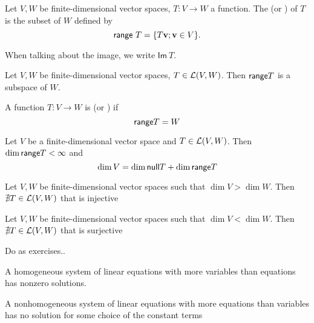 \documentclass[aspectratio=169]{beamer}
\begin{document}
\begin{frame}
\begin{definition}[Range]
Let $V,W$ be finite-dimensional vector spaces, $T:V\to W$ a function. The  (or ) of $T$ is the subset of $W$ defined by
\[
\mathsf{range}\ T=\{T\mathbf{v};\mathbf{v}\in V\}.
\]
\end{definition}
When talking about the image, we write $\mathsf{Im}\ T$.
\vfill
\begin{importanttheorem}
Let $V,W$ be finite-dimensional vector spaces, $T\in\mathcal{L}(V,W)$. Then $\mathsf{range} T$ is a subspace of $W$.
\end{importanttheorem}

\end{frame}

\begin{frame}
\begin{definition}[Surjectivity]
A function $T:V\to W$ is  (or ) if
\[
\mathsf{range} T=W
\]
\end{definition}
\vfill
\begin{importanttheorem}
Let $V$ be a finite-dimensional vector space and $T\in\mathcal{L}(V,W)$. Then $\dim\mathsf{range} T<\infty$ and
\[
\dim V=\dim\mathsf{null} T+\dim\mathsf{range} T
\]
\end{importanttheorem}
\end{frame}


\begin{frame}
\begin{importanttheorem}
Let $V,W$ be finite-dimensional vector spaces such that $\dim V>\dim W$. Then $\nexists T\in\mathcal{L}(V,W)$ that is injective
\end{importanttheorem}
\vfill
\begin{importanttheorem}
Let $V,W$ be finite-dimensional vector spaces such that $\dim V<\dim W$. Then $\nexists T\in\mathcal{L}(V,W)$ that is surjective
\end{importanttheorem}
\end{frame}



\begin{frame}{Do as exercises..}
\begin{theorem}
A homogeneous system of linear equations with more variables than equations has nonzero solutions.
\end{theorem}
\vfill
\begin{theorem}
A nonhomogeneous system of linear equations with more equations than variables has no solution for some choice of the constant terms
\end{theorem}
\end{frame}
\end{document}
